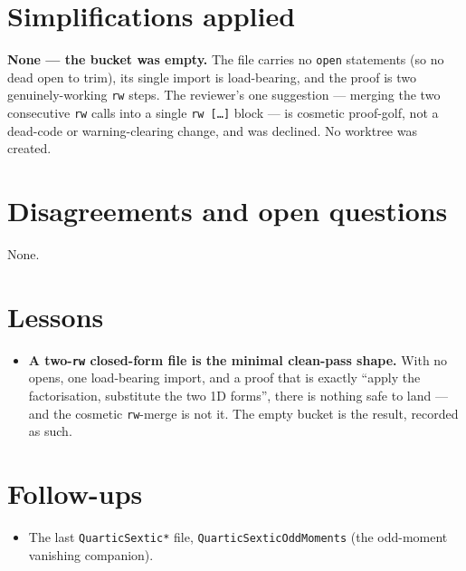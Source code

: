 \documentclass[11pt]{article}
\begin{document}
\section{Simplifications applied}
\textbf{None --- the bucket was empty.} The file carries no \texttt{open} statements (so no dead
open to trim), its single import is load-bearing, and the proof is two genuinely-working
\texttt{rw} steps. The reviewer's one suggestion --- merging the two consecutive \texttt{rw} calls
into a single \texttt{rw [\dots]} block --- is cosmetic proof-golf, not a dead-code or
warning-clearing change, and was declined. No worktree was created.

\section{Disagreements and open questions}
None.

\section{Lessons}
\begin{itemize}[noitemsep]
  \item \textbf{A two-\texttt{rw} closed-form file is the minimal clean-pass shape.} With no opens,
    one load-bearing import, and a proof that is exactly ``apply the factorisation, substitute the
    two 1D forms'', there is nothing safe to land --- and the cosmetic \texttt{rw}-merge is not it.
    The empty bucket is the result, recorded as such.
\end{itemize}

\section{Follow-ups}
\begin{itemize}[noitemsep]
  \item The last \texttt{QuarticSextic*} file, \texttt{QuarticSexticOddMoments} (the odd-moment
    vanishing companion).
\end{itemize}
\end{document}
